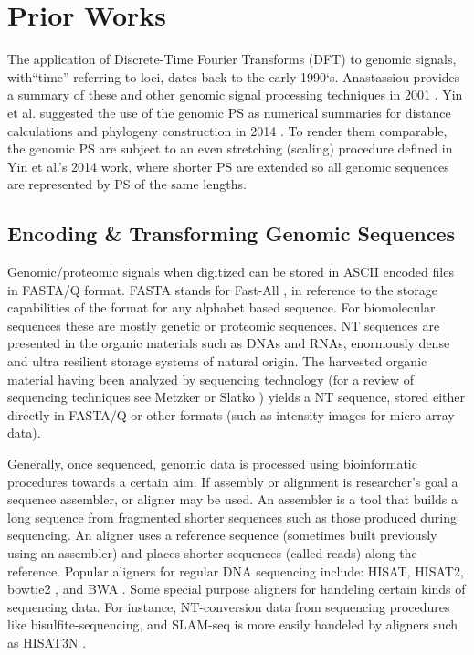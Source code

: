 \documentclass[10pt,conference]{IEEEtran}
\begin{document}
\section{Prior Works}
\label{sec:pw}
\noindent The application of Discrete-Time Fourier Transforms (DFT) to genomic signals, with``time'' referring to loci, dates back to the early 1990`s.  
Anastassiou provides a summary of these and other genomic signal processing techniques in 2001 \cite{Ana01}.
Yin et al. suggested the use of the genomic PS as numerical summaries for distance calculations and phylogeny construction in 2014 
\cite{yin20, yin14, yin15,pei19,Hoa15}.
To render them comparable, the genomic PS are subject to an even stretching (scaling) procedure defined in Yin et al.'s 2014 work, 
where shorter PS are extended so all genomic sequences are represented by PS of the same lengths. 

\subsection{Encoding \& Transforming Genomic Sequences}
\noindent Genomic/proteomic signals when digitized can be stored in ASCII encoded files in FASTA/Q format.  
FASTA stands for Fast-All  \cite{Lip85}, in reference to the storage capabilities of the format for any alphabet based sequence.
For biomolecular sequences these are mostly genetic or proteomic sequences.  
NT sequences are presented in the organic materials such as DNAs and RNAs, enormously dense and ultra resilient storage systems of natural origin. 
The harvested organic material having been analyzed by sequencing technology (for a review of sequencing techniques see Metzker \cite{Met10} or Slatko \cite{Sla18}) yields a NT sequence, stored either directly in FASTA/Q or other formats (such as intensity images for micro-array data). 

Generally, once sequenced, genomic data is processed using bioinformatic procedures towards a certain aim. 
If assembly or alignment is researcher's goal a sequence assembler, or aligner may be used.  
An assembler is a tool that builds a long sequence from fragmented shorter sequences such as those produced during sequencing.
An aligner uses a reference sequence (sometimes built previously using an assembler) and places shorter sequences (called reads)
 along the reference.
Popular aligners for regular DNA sequencing include: HISAT, \cite{kim15} HISAT2\cite{Kim19}, bowtie2 \cite{lan12}, and BWA \cite{li09}.
Some special purpose aligners for handeling certain kinds of sequencing data.
For instance, NT-conversion data from sequencing procedures like bisulfite-sequencing, and SLAM-seq is more easily handeled by aligners such as HISAT3N \cite{Zha20}.
\end{document}
